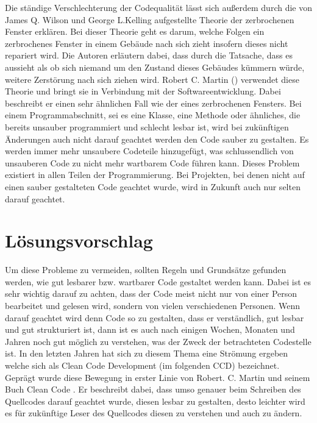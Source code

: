 \SuperPar Die ständige Verschlechterung der Codequalität lässt sich außerdem durch die von James Q. Wilson und George L.Kelling \cite{Wilson2016}  aufgestellte Theorie der zerbrochenen Fenster erklären. Bei dieser Theorie geht es darum, welche Folgen ein zerbrochenes Fenster in einem Gebäude nach sich zieht insofern dieses nicht repariert wird. Die Autoren erläutern dabei, dass durch die Tatsache, dass es aussieht als ob sich niemand um den Zustand dieses Gebäudes kümmern würde, weitere Zerstörung nach sich ziehen wird. Robert C. Martin (\cite{Martin2008}) verwendet diese Theorie und bringt sie in Verbindung mit der Softwareentwicklung. Dabei beschreibt er einen sehr ähnlichen Fall wie der eines zerbrochenen Fensters. Bei einem Programmabschnitt, sei es eine Klasse, eine Methode oder ähnliches, die bereits unsauber programmiert und schlecht lesbar ist, wird bei zukünftigen Änderungen auch nicht darauf geachtet werden den Code sauber zu gestalten. Es werden immer mehr unsaubere Codeteile hinzugefügt, was schlussendlich von unsauberen Code zu nicht mehr wartbarem Code führen kann. Dieses Problem existiert in allen Teilen der Programmierung. Bei Projekten, bei denen nicht auf einen sauber gestalteten Code geachtet wurde, wird in Zukunft auch nur selten darauf geachtet. 

\section{Lösungsvorschlag}
Um diese Probleme zu vermeiden, sollten Regeln und Grundsätze gefunden werden, wie gut lesbarer bzw. wartbarer Code gestaltet werden kann. Dabei ist es sehr wichtig darauf zu achten, dass der Code meist nicht nur von einer Person bearbeitet und gelesen wird, sondern von vielen verschiedenen Personen. Wenn darauf geachtet wird denn Code so zu gestalten, dass er verständlich, gut lesbar und gut strukturiert ist, dann ist es auch nach einigen Wochen, Monaten und Jahren noch gut möglich zu verstehen, was der Zweck der betrachteten Codestelle ist. In den letzten Jahren hat sich zu diesem Thema eine Strömung ergeben welche sich als Clean Code Development (im folgenden CCD) bezeichnet. Geprägt wurde diese Bewegung in erster Linie von Robert. C. Martin und seinem Buch Clean Code \cite{Martin2008}. Er beschreibt dabei, dass umso genauer beim Schreiben des Quellcodes darauf geachtet wurde, diesen lesbar zu gestalten, desto leichter wird es für zukünftige Leser des Quellcodes diesen zu verstehen und auch zu ändern. 

